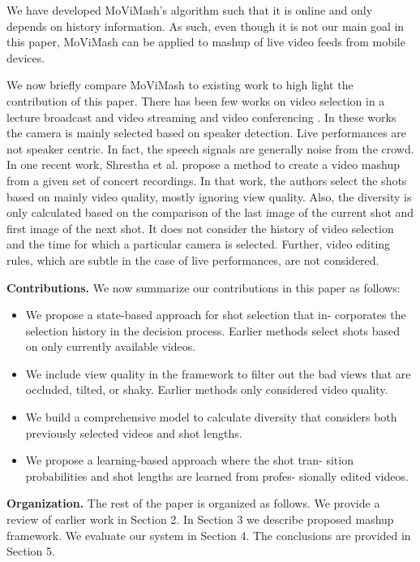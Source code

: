 \documentclass{sig-alternate}
\begin{document}
We have developed MoViMash's algorithm such that it is online
and only depends on history information. As such, even though
it is not our main goal in this paper, MoViMash can be applied to
mashup of live video feeds from mobile devices.

We now briefly compare MoViMash to existing work to high light the contribution of this paper. There has been few works on video selection in a lecture broadcast and video streaming \cite{21} \cite{6}
and video conferencing \cite{3}. In these works the camera is mainly
selected based on speaker detection. Live performances are not
speaker centric. In fact, the speech signals are generally noise from
the crowd. In one recent work, Shrestha et al. \cite{15} propose a method to create a video mashup from a given set of concert recordings. In that work, the authors select the shots based on mainly video quality, mostly ignoring view quality. Also, the diversity is only calculated based on the comparison of the last image of the current shot and first image of the next shot. It does not consider the history of video selection and the time for which a particular camera is selected. Further, video editing rules, which are subtle in the case of live performances, are not considered. 

\textbf{Contributions.} We now summarize our contributions in this paper as follows:

\begin{itemize}
\item We propose a state-based approach for shot selection that in-
corporates the selection history in the decision process. Earlier methods select shots based on only currently available videos.
\item  We include view quality in the framework to filter out the
bad views that are occluded, tilted, or shaky. Earlier methods
only considered video quality.
\item  We build a comprehensive model to calculate diversity that
considers both previously selected videos and shot lengths.
\item  We propose a learning-based approach where the shot tran-
sition probabilities and shot lengths are learned from profes-
sionally edited videos.
\end{itemize}

\textbf{Organization.} The rest of the paper is organized as follows.
We provide a review of earlier work in Section 2. In Section 3 we
describe proposed mashup framework. We evaluate our system in
Section 4. The conclusions are provided in Section 5.
\end{document}
